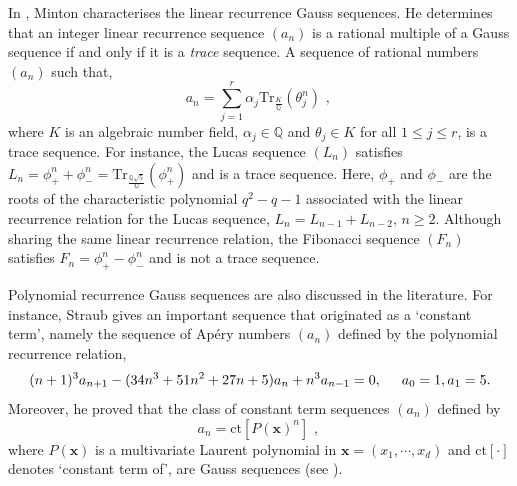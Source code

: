 \documentclass{article}
\numberwithin{equation}{section}
\theoremstyle{definition}
\begin{document}
In \cite{minton_gauss}, Minton characterises the linear recurrence Gauss sequences. He determines that an integer linear recurrence sequence $(a_n)$ is a rational multiple of a Gauss sequence if and only if it is a \textit{trace} sequence. A sequence of rational numbers $(a_n)$ such that, 
    \[a_n=\sum_{j=1}^{r}\alpha_j\text{Tr}_{\frac{K}{\mathbb{Q}}}(\theta_j^n)\text{ , }\]
where $K$ is an algebraic number field, $\alpha_j \in \mathbb{Q}$ and $\theta_j \in K$ for all $1\leq j\leq r$, is a trace sequence. For instance, the Lucas sequence $(L_n)$ satisfies $L_n=\phi_+^n+\phi_-^n=\text{Tr}_\frac{\mathbb{Q}\sqrt{5}}{\mathbb{Q}}(\phi_+^n)$ and is a trace sequence. Here, $\phi_+$ and $\phi_-$ are the roots of the characteristic polynomial $q^2-q-1$ associated with the linear recurrence relation for the Lucas sequence, $L_n=L_{n-1}+L_{n-2}\text{, }n\geq2$. Although sharing the same linear recurrence relation, the Fibonacci sequence $(F_n)$ satisfies $F_n=\phi_+^n-\phi_-^n$ and is not a trace sequence. 

Polynomial recurrence Gauss sequences are also discussed in the literature. For instance, Straub \cite{armin_constant} gives an important sequence that originated as a `constant term', namely the sequence of Apéry numbers $(a_n)$ defined by the polynomial recurrence relation, 
 \[(n+1)^3a_{n+1}-(34n^3+51n^2+27n+5)a_n+n^3a_{n-1} = 0, \\\text{\hspace{5mm}}a_0=1, a_1=5.\]
 Moreover, he proved that the class of constant term sequences $(a_n)$ defined by 
\[a_n=\text{ct}[P(\mathbf{x})^n]\text{ , }\]
where $P(\mathbf{x})$ is a multivariate Laurent polynomial in $\mathbf{x}=(x_1,\cdots,x_d)$ and $\text{ct}[\cdot]$ denotes `constant term of', are Gauss sequences (see \cite[Proposition 5.1]{armin_constant}).
\end{document}
